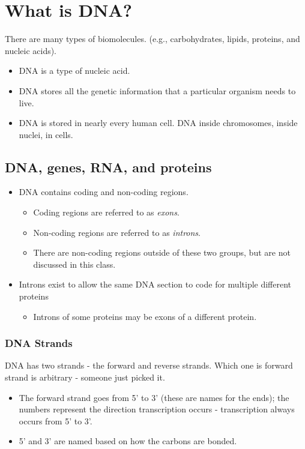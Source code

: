 \documentclass[10pt]{article}
\begin{document}
\section*{What is DNA?}
There are many types of biomolecules.  (e.g., carbohydrates, lipids, proteins, and nucleic acids).
\begin{itemize}
    \item DNA is a type of nucleic acid.
    \item DNA stores all the genetic information that a particular organism needs to live.
    \item DNA is stored in nearly every human cell.  DNA inside chromosomes, inside nuclei, in cells.
\end{itemize}
\subsection*{DNA, genes, RNA, and proteins}
\begin{itemize}
    \item DNA contains coding and non-coding regions.
    \begin{itemize}
        \item Coding regions are referred to as \textit{exons}.
        \item Non-coding regions are referred to as \textit{introns}.
        \item There are non-coding regions outside of these two groups, but are not discussed in this class.
    \end{itemize}
    \item Introns exist to allow the same DNA section to code for multiple different proteins
    \begin{itemize}
        \item Introns of some proteins may be exons of a different protein.
    \end{itemize}
\end{itemize}
\subsubsection*{DNA Strands}
DNA has two strands - the forward and reverse strands.  Which one is forward strand is arbitrary - someone just picked it.
\begin{itemize}
    \item The forward strand goes from 5' to 3' (these are names for the ends); the numbers represent the direction transcription occurs - transcription always occurs from 5' to 3'.
    \item 5' and 3' are named based on how the carbons are bonded.
\end{itemize}
\end{document}
